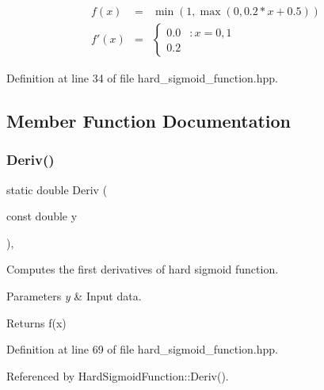 \begin{eqnarray*} f(x) &=& \min(1, \max(0, 0.2 * x + 0.5)) \\ f'(x) &=& \left\{ \begin{array}{lr} 0.0 & : x={0,1} \\ 0.2 \end{array} \right. \end{eqnarray*} 

Definition at line 34 of file hard\+\_\+sigmoid\+\_\+function.\+hpp.



\subsection{Member Function Documentation}
\mbox{\label{classmlpack_1_1ann_1_1HardSigmoidFunction_a163d34fd09f8edf457164f5033c635cf}} 
\subsubsection{Deriv()\hspace{0.1cm}{\footnotesize\ttfamily [1/2]}}
{\footnotesize\ttfamily static double Deriv (\begin{DoxyParamCaption}\item[{const double}]{y }\end{DoxyParamCaption})\hspace{0.3cm}{\ttfamily [inline]}, {\ttfamily [static]}}



Computes the first derivatives of hard sigmoid function. 


\begin{DoxyParams}{Parameters}
{\em y} & Input data. \\
\hline
\end{DoxyParams}
\begin{DoxyReturn}{Returns}
f\textquotesingle{}(x) 
\end{DoxyReturn}


Definition at line 69 of file hard\+\_\+sigmoid\+\_\+function.\+hpp.



Referenced by Hard\+Sigmoid\+Function\+::\+Deriv().

\mbox{\label{classmlpack_1_1ann_1_1HardSigmoidFunction_ad442502c34b67303b74c735641dab790}} 

